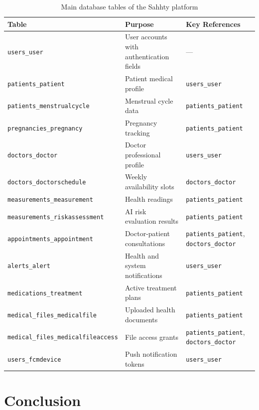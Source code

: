 \begin{table}[H]
\centering
\caption{Main database tables of the Sahhty platform}
\renewcommand{\arraystretch}{1.3}
\begin{tabular}{|p{4cm}|p{5cm}|p{5cm}|}
\hline
\textbf{Table} & \textbf{Purpose} & \textbf{Key References} \\
\hline
\texttt{users\_user} & User accounts with authentication fields & — \\
\hline
\texttt{patients\_patient} & Patient medical profile & \texttt{users\_user} \\
\hline
\texttt{patients\_menstrualcycle} & Menstrual cycle data & \texttt{patients\_patient} \\
\hline
\texttt{pregnancies\_pregnancy} & Pregnancy tracking & \texttt{patients\_patient} \\
\hline
\texttt{doctors\_doctor} & Doctor professional profile & \texttt{users\_user} \\
\hline
\texttt{doctors\_doctorschedule} & Weekly availability slots & \texttt{doctors\_doctor} \\
\hline
\texttt{measurements\_measurement} & Health readings & \texttt{patients\_patient} \\
\hline
\texttt{measurements\_riskassessment} & AI risk evaluation results & \texttt{patients\_patient} \\
\hline
\texttt{appointments\_appointment} & Doctor-patient consultations & \texttt{patients\_patient}, \texttt{doctors\_doctor} \\
\hline
\texttt{alerts\_alert} & Health and system notifications & \texttt{users\_user} \\
\hline
\texttt{medications\_treatment} & Active treatment plans & \texttt{patients\_patient} \\
\hline
\texttt{medical\_files\_medicalfile} & Uploaded health documents & \texttt{patients\_patient} \\
\hline
\texttt{medical\_files\_medicalfileaccess} & File access grants & \texttt{patients\_patient}, \texttt{doctors\_doctor} \\
\hline
\texttt{users\_fcmdevice} & Push notification tokens & \texttt{users\_user} \\
\hline
\end{tabular}
\end{table}

\section{Conclusion}

